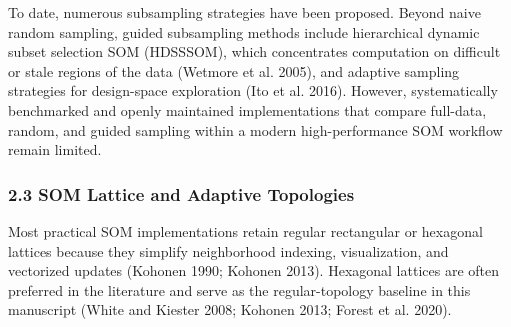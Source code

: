 \documentclass[
]{article}
\begin{document}
To date, numerous subsampling strategies have been proposed. Beyond
naive random sampling, guided subsampling methods include hierarchical
dynamic subset selection SOM (HDSSSOM), which concentrates computation
on difficult or stale regions of the data (Wetmore et al. 2005), and
adaptive sampling strategies for design-space exploration ({Ito et al.}
2016). However, systematically benchmarked and openly maintained
implementations that compare full-data, random, and guided sampling
within a modern high-performance SOM workflow remain limited.

\subsubsection{2.3 SOM Lattice and Adaptive
Topologies}\label{som-lattice-and-adaptive-topologies}

Most practical SOM implementations retain regular rectangular or
hexagonal lattices because they simplify neighborhood indexing,
visualization, and vectorized updates (Kohonen 1990; Kohonen 2013).
Hexagonal lattices are often preferred in the literature and serve as
the regular-topology baseline in this manuscript (White and Kiester
2008; Kohonen 2013; Forest et al. 2020).
\end{document}
